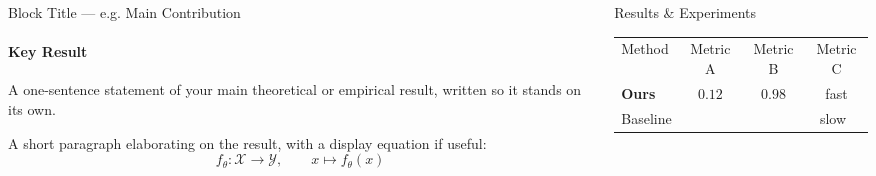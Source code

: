 \documentclass[final,dvipsnames]{beamer}
\newcommand{\xmark}{\ding{55}}%
\newlength{\colWidth}
\begin{document}
\begin{frame}[t]
\begin{columns}[t]
\begin{column}{\colWidth}
\begin{block}{Block Title --- e.g. Main Contribution}
          \begin{highlight}
            \paragraph{Key Result} A one-sentence statement of your main theoretical or
            empirical result, written so it stands on its own.
          \end{highlight}

          A short paragraph elaborating on the result, with a display equation if useful:
          \begin{equation*}
            f_\theta : \mathcal{X} \to \mathcal{Y}, \qquad x \mapsto f_\theta(x)
          \end{equation*}

        \end{block}

      \end{column}


      \begin{column}{\colWidth}

        \begin{block}{Results \& Experiments}

          \begin{table}[h]
            \centering
            \renewcommand{\arraystretch}{1.25}
            \begin{tabular}{lccc}
              \toprule
              Method & Metric A & Metric B & Metric C \\
              \cmidrule(lr){1-1} \cmidrule(lr){2-4}
              \textbf{Ours} & \multirow{2}{*}{$0.12$} & \multirow{2}{*}{$0.98$} & fast \\
              Baseline & & & slow~\xmark \\
              \bottomrule
            \end{tabular}
          \end{table}


\end{block}
\end{column}
\end{columns}
\end{frame}
\end{document}
